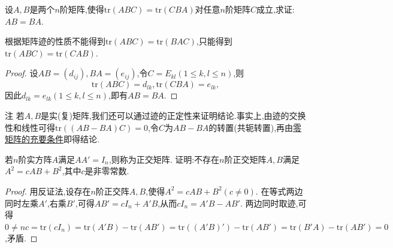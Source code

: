\documentclass[../../main.tex]{subfiles}%
\begin{document}
\begin{proposition}\label{proposition:矩阵可交换关于迹的充分条件}
设\(A,B\)是两个\(n\)阶矩阵,使得\(\mathrm{tr}(ABC)=\mathrm{tr}(CBA)\)对任意\(n\)阶矩阵\(C\)成立,求证:\(AB = BA\).
\end{proposition}
\begin{remark}
根据矩阵迹的性质不能得到$\mathrm{tr}(ABC)=\mathrm{tr}(BAC)$,只能得到$\mathrm{tr}(ABC)=\mathrm{tr}(CAB)$.
\end{remark}
\begin{proof}

设\(AB=(d_{ij}),BA=(e_{ij})\),令\(C = E_{kl}(1\leqslant  k,l\leqslant  n)\),则
\[
\mathrm{tr}(ABC)=d_{lk},\mathrm{tr}(CBA)=e_{lk},
\]
因此\(d_{lk}=e_{lk}(1\leqslant  k,l\leqslant  n)\),即有\(AB = BA\).

\end{proof}
\begin{remark}
注 若\(A,B\)是实(复)矩阵,我们还可以通过迹的正定性来证明结论.事实上,由迹的交换性和线性可得\(\mathrm{tr}((AB - BA)C)=0\),令\(C\)为\(AB - BA\)的转置(共轭转置),再由\hyperref[proposition:零矩阵的充要条件]{零矩阵的充要条件}即得结论.
\end{remark}

\begin{example}
若\(n\)阶实方阵\(A\)满足\(AA' = I_n\),则称为正交矩阵. 证明:不存在\(n\)阶正交矩阵\(A,B\)满足\(A^2 = cAB + B^2\),其中\(c\)是非零常数.
\end{example}
\begin{proof}

用反证法,设存在\(n\)阶正交阵\(A,B\),使得\(A^2 = cAB + B^2(c\neq0)\). 在等式两边同时左乘\(A'\),右乘\(B'\),可得\(AB' = cI_n + A'B\),从而\(cI_n = A'B - AB'\). 两边同时取迹,可得\(0\ne nc=\text{tr}(cI_n)=\text{tr}(A'B)-\text{tr}(AB')=\text{tr}((A'B)') - \text{tr}(AB')=\text{tr}(B'A)-\text{tr}(AB') = 0\),矛盾.

\end{proof}
\end{document}
